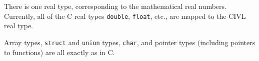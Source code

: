 There is one real type, corresponding to the mathematical real
numbers. Currently, all of the C real types \texttt{double},
\texttt{float}, etc., are mapped to the CIVL real type.

Array types, \texttt{struct} and \texttt{union} types, \texttt{char},
and pointer types (including pointers to functions) are all exactly as
in C.









